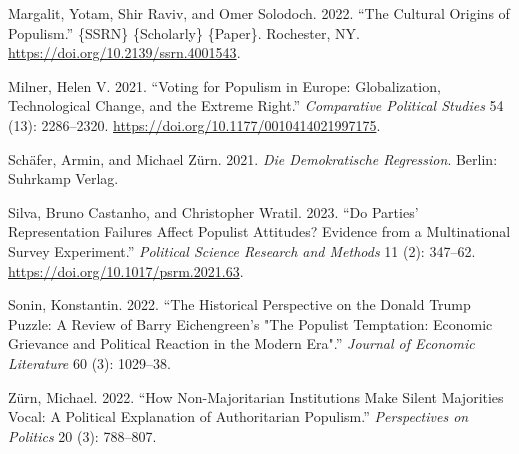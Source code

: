 \documentclass[
]{article}
\newlength{\cslhangindent}
\newlength{\cslentryspacingunit} %
\newenvironment{CSLReferences}[2] %
 {%
  \setlength{\parindent}{0pt}
  \ifodd #1
  \let\oldpar\par
  \def\par{\hangindent=\cslhangindent\oldpar}
  \fi
  \setlength{\parskip}{#2\cslentryspacingunit}
 }%
 {}
\begin{document}
\begin{CSLReferences}{1}{0}
\leavevmode{}%
Margalit, Yotam, Shir Raviv, and Omer Solodoch. 2022. {``The {Cultural}
{Origins} of {Populism}.''} \{SSRN\} \{Scholarly\} \{Paper\}. Rochester,
NY. \url{https://doi.org/10.2139/ssrn.4001543}.

\leavevmode{}%
Milner, Helen V. 2021. {``Voting for {Populism} in {Europe}:
{Globalization}, {Technological} {Change}, and the {Extreme} {Right}.''}
\emph{Comparative Political Studies} 54 (13): 2286--2320.
\url{https://doi.org/10.1177/0010414021997175}.

\leavevmode{}%
Schäfer, Armin, and Michael Zürn. 2021. \emph{Die Demokratische
{Regression}}. Berlin: Suhrkamp Verlag.

\leavevmode{}%
Silva, Bruno Castanho, and Christopher Wratil. 2023. {``Do Parties'
Representation Failures Affect Populist Attitudes? {Evidence} from a
Multinational Survey Experiment.''} \emph{Political Science Research and
Methods} 11 (2): 347--62. \url{https://doi.org/10.1017/psrm.2021.63}.

\leavevmode{}%
Sonin, Konstantin. 2022. {``The {Historical} {Perspective} on the
{Donald} {Trump} {Puzzle}: {A} {Review} of {Barry} {Eichengreen}'s
"{The} {Populist} {Temptation}: {Economic} {Grievance} and {Political}
{Reaction} in the {Modern} {Era}".''} \emph{Journal of Economic
Literature} 60 (3): 1029--38.

\leavevmode{}%
Zürn, Michael. 2022. {``How {Non}-{Majoritarian} {Institutions} {Make}
{Silent} {Majorities} {Vocal}: {A} {Political} {Explanation} of
{Authoritarian} {Populism}.''} \emph{Perspectives on Politics} 20 (3):
788--807.

\end{CSLReferences}
\end{document}
